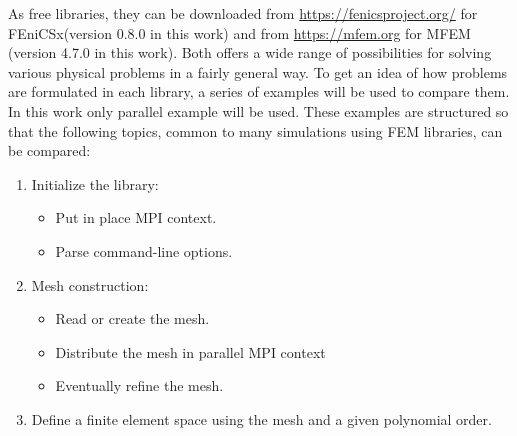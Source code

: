 \documentclass[12pt]{article}
\newcommand{\f}[1]{FEniCSx#1}
\begin{document}
As free libraries, they can be downloaded from  \url{https://fenicsproject.org/} for \f{}(version 0.8.0 in this work) and from  \url{https://mfem.org} for MFEM (version 4.7.0 in this work). Both offers a wide range of possibilities for solving various physical problems in a fairly general way.  To get an idea of how problems are formulated in each library, a series of examples will be used to compare them. In this work only parallel example will be used. These examples are structured so that the following topics, common to many simulations using FEM libraries, can be compared:
\begin{enumerate}
	\item Initialize the library\label{point_init}:
	\begin{itemize}
		\item Put in place MPI context.
		\item Parse command-line options.
	\end{itemize}
\item Mesh construction\label{point_mesh}: 
	\begin{itemize}
	\item Read or create the mesh.
	\item Distribute the mesh in parallel MPI context
	\item Eventually refine the mesh.
    \end{itemize}
\item Define a finite element space using the mesh and a given polynomial order. \label{point_space}


\end{enumerate}
\end{document}
